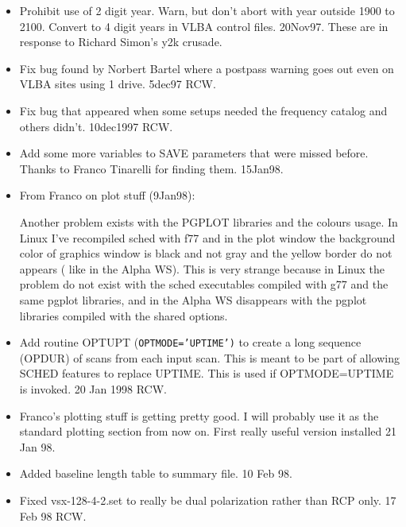 \documentclass{report}
\begin{document}
\begin{itemize}

\item Prohibit use of 2 digit year.  Warn, but don't abort with
      year outside 1900 to 2100.  Convert to 4 digit years in
      VLBA control files.  20Nov97.  These are in response
      to Richard Simon's y2k crusade.

\item Fix bug found by Norbert Bartel where a postpass warning goes
      out even on VLBA sites using 1 drive.  5dec97 RCW.

\item Fix bug that appeared when some setups needed the frequency
      catalog and others didn't.  10dec1997  RCW.

\item Add some more variables to SAVE parameters that were missed
      before.  Thanks to Franco Tinarelli for finding them.  15Jan98.

\item From Franco on plot stuff (9Jan98):

  Another problem exists with the PGPLOT libraries and the colours usage.
  In Linux I've recompiled sched with f77 and in the plot window the
  background color of graphics window is black and not gray and the yellow
  border do not appears ( like in the Alpha WS). This is very strange
  because in Linux the problem do not exist with the sched executables compiled
  with g77 and the same pgplot libraries, and in the Alpha WS disappears with
  the pgplot libraries compiled with the shared options.

\item Add routine OPTUPT {(\tt OPTMODE='UPTIME')} to create a long
      sequence (OPDUR) of scans from each
      input scan.  This is meant to be part of allowing SCHED features
      to replace UPTIME.  This is used if OPTMODE=UPTIME is invoked.
      20 Jan 1998  RCW.

\item Franco's plotting stuff is getting pretty good.  I will probably
      use it as the standard plotting section from now on.
      First really useful version installed 21 Jan 98.

\item Added baseline length table to summary file.  10 Feb 98.

\item Fixed vsx-128-4-2.set to really be dual polarization rather
      than RCP only.  17 Feb 98 RCW.


\end{itemize}
\end{document}
